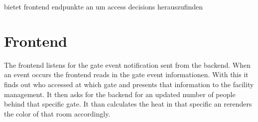 bietet frontend endpunkte an um access decisions herauszufinden

\section{Frontend}
\label{Frontend}

The frontend listens for the gate event notification sent from the backend. When an event occurs the frontend reads in the gate event informationen. With this it finds out who accessed at which gate and presents that information to the facility management. It then asks for the backend for an updated number of people behind that specific gate. It than calculates the heat in that specific an rerenders the color of that room accordingly.





